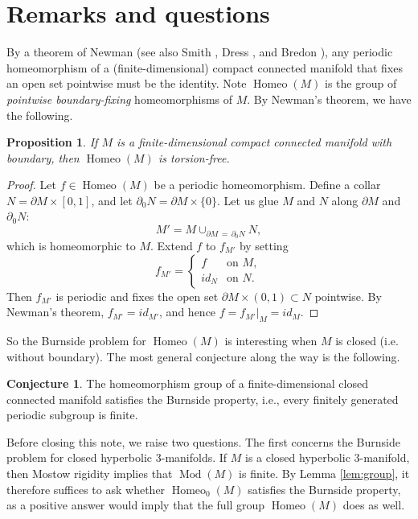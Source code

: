 \documentclass[12pt,a4paper]{amsart}
\numberwithin{equation}{section}
\DeclareMathOperator{\Homeo}{Homeo}
\theoremstyle{plain}
\newtheorem{proposition}[theorem]{Proposition}
\theoremstyle{definition}
\newtheorem{conjecture}[theorem]{Conjecture}
\theoremstyle{remark}
\begin{document}
\section*{Remarks and questions}

By a theorem of Newman \cite{N31} (see also Smith \cite{MR4128}, Dress \cite{MR238353}, and Bredon \cite{MR413144}), any periodic homeomorphism of a (finite-dimensional) compact connected manifold that fixes an open set pointwise must be the identity.
Note $\Homeo(M)$ is the group of \emph{pointwise boundary-fixing} homeomorphisms of $M$.
By Newman's theorem, we have the following.

\begin{proposition}
    If $M$ is a finite-dimensional compact connected manifold with boundary, then $\Homeo(M)$ is torsion-free.
\end{proposition}

\begin{proof}
    Let $f \in \Homeo(M)$ be a periodic homeomorphism.
    Define a collar $N = \partial M \times [0,1]$, and let $\partial_0 N = \partial M \times \{0\}$.
    Let us glue $M$ and $N$ along $\partial M$ and $\partial_0N$:
    \[
        M' = M \cup_{\partial M \,=\, \partial_0 N} N,
    \]
    which is homeomorphic to $M$.
    Extend $f$ to $f_{M'}$ by setting
    \[
        f_{M'} = \begin{cases} f & \text{on } M, \\ id_N & \text{on } N. \end{cases}
    \]
    Then $f_{M'}$ is periodic and fixes the open set $\partial M \times (0, 1) \subset N$ pointwise.
    By Newman's theorem, $f_{M'} = id_{M'}$, and hence $f = f_{M'}|_M = id_M$.
\end{proof}

So the Burnside problem for $\Homeo(M)$ is interesting when $M$ is closed (i.e. without boundary).
The most general conjecture along the way is the following.

\begin{conjecture}
    The homeomorphism group of a finite-dimensional closed connected manifold satisfies the Burnside property, i.e., every finitely generated periodic subgroup is finite.
\end{conjecture}

Before closing this note, we raise two questions.
The first concerns the Burnside problem for closed hyperbolic $3$-manifolds.
If $M$ is a closed hyperbolic $3$-manifold, then Mostow rigidity \cite{MR236383} implies that $\operatorname{Mod}(M)$ is finite.
By Lemma \ref{lem:group}, it therefore suffices to ask whether $\operatorname{Homeo}_0(M)$ satisfies the Burnside property, as a positive answer would imply that the full group $\operatorname{Homeo}(M)$ does as well.
\end{document}
